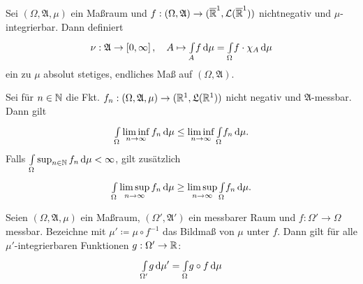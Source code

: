 \documentclass{cheat-sheet}
\newcommand{\Alg}{\mathfrak{A}} %
\newcommand{\LebAlg}{\mathfrak{L}} %
\newcommand{\Leb}{\mathcal{L}} %
\newcommand{\IntOmu}[1]{\Int{\Omega}{}{#1}{\mu}} %
\begin{document}
\begin{satz}
  Sei $(\Omega, \Alg, \mu)$ ein Maßraum und $f : (\Omega, \Alg) \to (\ER^1, \Leb(\ER^1))$ nichtnegativ und $\mu$-integrierbar. Dann definiert
  \[ \nu : \Alg \to \left[0, \infty \right], \quad A \mapsto \Int{A}{}{f}{\mu} = \IntOmu{f \cdot \chi_A} \]
  ein zu $\mu$ absolut stetiges, endliches Maß auf $(\Omega, \Alg)$.
\end{satz}

\begin{lem}[Fatou]
  Sei für $n \in \mathbb{N}$ die Fkt. $f_n : (\Omega, \Alg, \mu) \to (\R^1, \LebAlg(\R^1))$ nicht negativ und $\Alg$-messbar. Dann gilt
  \[ \IntOmu{\liminf_{n \to \infty} f_n} \leq \liminf_{n \to \infty} \IntOmu{f_n}. \]
  Falls $\IntOmu{\sup_{n \in \N} f_n} < \infty$, gilt zusätzlich
  \[ \IntOmu{\limsup_{n \to \infty} f_n} \geq \limsup_{n \to \infty} \IntOmu{f_n}. \]
\end{lem}



































\begin{satz}
  Seien $(\Omega, \Alg, \mu)$ ein Maßraum, $(\Omega', \Alg')$ ein messbarer Raum und $f : \Omega' \to \Omega$ messbar. Bezeichne mit $\mu' \coloneqq \mu \circ f^{-1}$ das Bildmaß von $\mu$ unter $f$. Dann gilt für alle $\mu'$-integrierbaren Funktionen $g : \Omega' \to \mathbb{R}$:
  \[ \Int{\Omega'}{}{g}{\mu'} = \IntOmu{g \circ f} \]
\end{satz}
\end{document}
